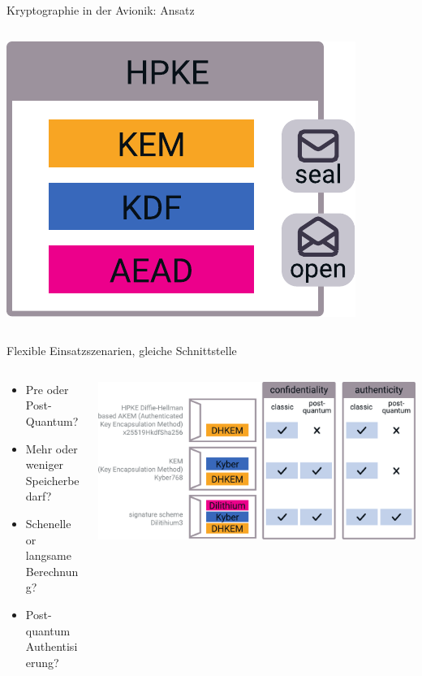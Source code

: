 \begin{frame}[c]{Kryptographie in der Avionik: Ansatz}
\begin{columns}[fullwidth,c]
\begin{column}{.35\linewidth}
        \includegraphics[width=0.8\linewidth]{graphics/hpke}
    \end{column}
  \end{columns}
\end{frame}


\begin{frame}[c]{Flexible Einsatzszenarien, gleiche Schnittstelle}
  \begin{columns}[fullwidth,c]
    \begin{column}{.35\linewidth}
      \begin{itemize}
        \item Pre oder Post-Quantum?
        \item Mehr oder weniger Speicherbedarf?
        \item Schenelle or langsame Berechnung?
        \item Post-quantum Authentisierung? 
      \end{itemize}
    \end{column}%
    \begin{column}{.65\linewidth}
      \includegraphics[width=\linewidth]{graphics/hpke variants}
    \end{column}
  \end{columns}
\end{frame}


